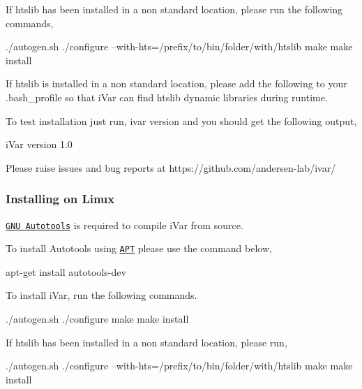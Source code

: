 If htslib has been installed in a non standard location, please run the following commands,


\begin{DoxyCode}
./autogen.sh
./configure --with-hts=/prefix/to/bin/folder/with/htslib
make
make install
\end{DoxyCode}


If htslib is installed in a non standard location, please add the following to your .bash\+\_\+profile so that i\+Var can find htslib dynamic libraries during runtime.




To test installation just run, {\ttfamily ivar version} and you should get the following output,


\begin{DoxyCode}
iVar version 1.0

Please raise issues and bug reports at https://github.com/andersen-lab/ivar/
\end{DoxyCode}


\subsubsection*{Installing on Linux}

\href{https://www.gnu.org/software/automake/manual/html_node/Autotools-Introduction.html#Autotools-Introduction}{\tt G\+NU Autotools} is required to compile i\+Var from source.

To install Autotools using \href{https://help.ubuntu.com/lts/serverguide/apt.html}{\tt A\+PT} please use the command below,


\begin{DoxyCode}
apt-get install autotools-dev
\end{DoxyCode}


To install i\+Var, run the following commands.


\begin{DoxyCode}
./autogen.sh
./configure
make
make install
\end{DoxyCode}


If htslib has been installed in a non standard location, please run,


\begin{DoxyCode}
./autogen.sh
./configure --with-hts=/prefix/to/bin/folder/with/htslib
make
make install
\end{DoxyCode}


